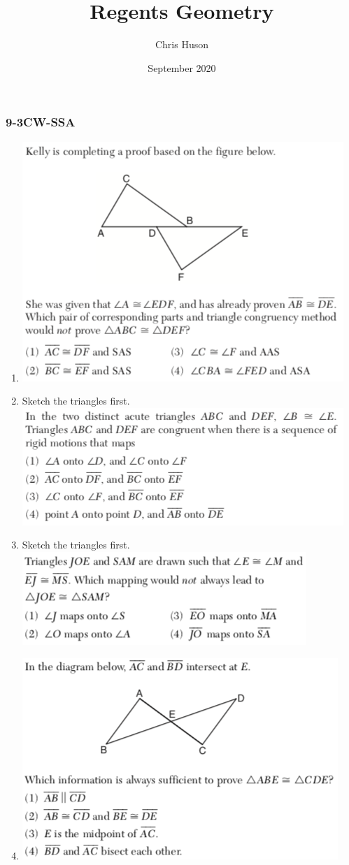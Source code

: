 \documentclass[12pt, twoside]{article}
\title{Regents Geometry}
\author{Chris Huson}
\date{September 2020}
\begin{document}
\subsubsection*{9-3CW-SSA}
\begin{enumerate}
\item \includegraphics[scale=0.8]{geom-62017-9.png}
\item Sketch the triangles first. \\
    \includegraphics[scale=0.8]{geom-62017-22.png}
\item Sketch the triangles first. \\
      \includegraphics[scale=0.8]{geom-62019-14.png}
\item \includegraphics[scale=0.8]{geom-62019-8.png}

\end{enumerate}
\end{document}
